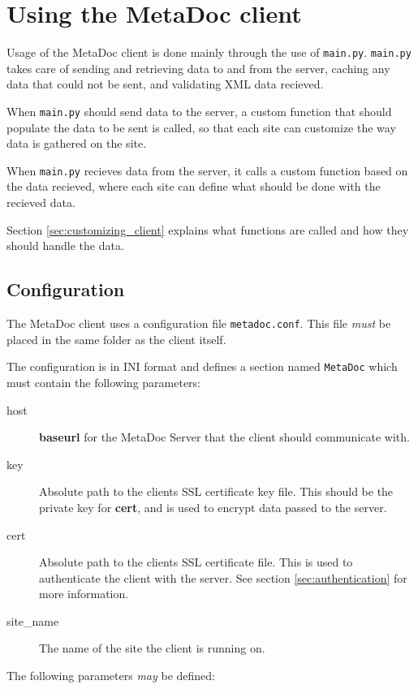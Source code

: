 \section{Using the MetaDoc client}
Usage of the MetaDoc client is done mainly through the use of \texttt{main.py}.
\texttt{main.py} takes care of sending and retrieving data to and from the 
server, caching any data that could not be sent, and validating XML data 
recieved.

When \texttt{main.py} should send data to the server, a custom function that
should populate the data to be sent is called, so that each site can customize
the way data is gathered on the site. 

When \texttt{main.py} recieves data from the server, it calls a custom function
based on the data recieved, where each site can define what should be done with
the recieved data.

Section \ref{sec:customizing_client} explains what functions are called and how
they should handle the data. 

\subsection{Configuration}
\label{sec:metadoc_conf}
The MetaDoc client uses a configuration file \texttt{metadoc.conf}. This file
\textit{must} be placed in the same folder as the client itself. 

The configuration is in INI format and defines a section named \texttt{MetaDoc}
which must contain the following parameters:

\begin{description}
    \item[host] \textbf{baseurl} for the MetaDoc Server that the client should
        communicate with.
    \item[key]  Absolute path to the clients SSL certificate key file. This
        should be the private key for \textbf{cert}, and is used to encrypt
        data passed to the server.
    \item[cert] Absolute path to the clients SSL certificate file. This is used
        to authenticate the client with the server. See section
        \ref{sec:authentication} for more information.
    \item[site\_name]   The name of the site the client is running on. 
\end{description}

The following parameters \textit{may} be defined:

